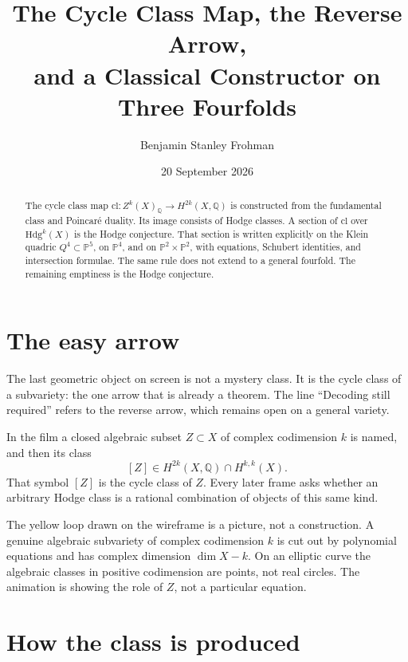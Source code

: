 \documentclass[11pt,a4paper]{article}
\title{\textbf{The Cycle Class Map, the Reverse Arrow,\\[0.25em]
and a Classical Constructor on Three Fourfolds}}
\author{Benjamin Stanley Frohman}
\date{20 September 2026}
\newcommand{\Q}{\mathbb{Q}}
\newcommand{\Pspace}{\mathbb{P}}
\theoremstyle{definition}
\theoremstyle{remark}
\begin{document}
\maketitle

\begin{abstract}
The cycle class map
\(\mathrm{cl}:Z^k(X)_{\Q}\to H^{2k}(X,\Q)\)
is constructed from the fundamental class and Poincar\'e duality. Its
image consists of Hodge classes. A section of \(\mathrm{cl}\) over
\(\mathrm{Hdg}^k(X)\) is the Hodge conjecture. That section is written
explicitly on the Klein quadric \(Q^4\subset\Pspace^5\), on
\(\Pspace^4\), and on \(\Pspace^2\times\Pspace^2\), with equations,
Schubert identities, and intersection formulae. The same rule does not
extend to a general fourfold. The remaining emptiness is the Hodge
conjecture.
\end{abstract}

\section{The easy arrow}

The last geometric object on screen is not a mystery class. It is the
cycle class of a subvariety: the one arrow that is already a theorem.
The line ``Decoding still required'' refers to the reverse arrow, which
remains open on a general variety.

In the film a closed algebraic subset \(Z\subset X\) of complex
codimension \(k\) is named, and then its class
\[
[Z]\in H^{2k}(X,\Q)\cap H^{k,k}(X).
\]
That symbol \([Z]\) is the cycle class of \(Z\). Every later frame asks
whether an arbitrary Hodge class is a rational combination of objects
of this same kind.

The yellow loop drawn on the wireframe is a picture, not a construction.
A genuine algebraic subvariety of complex codimension \(k\) is cut out
by polynomial equations and has complex dimension \(\dim X-k\). On an
elliptic curve the algebraic classes in positive codimension are points,
not real circles. The animation is showing the role of \(Z\), not a
particular equation.

\section{How the class is produced}
\end{document}
